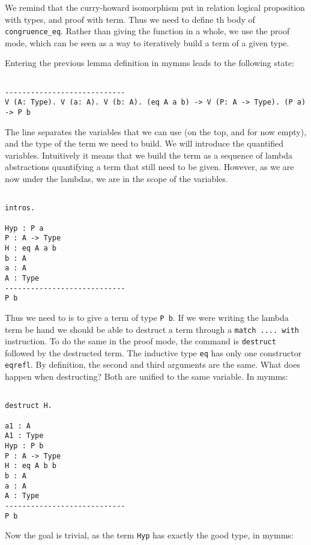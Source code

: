 \documentclass[a4paper,5pt,onecolumn]{article}
\begin{document}
We remind that the curry-howard isomorphism put in relation logical
proposition with types, and proof with term. Thus we need to define th
body of \texttt{congruence\_eq}. Rather than giving the function in a
whole, we use the proof mode, which can be seen as a way to
iteratively build a term of a given type.

Entering the previous lemma definition in mymms leads to the following state:

\begin{verbatim}

----------------------------
V (A: Type). V (a: A). V (b: A). (eq A a b) -> V (P: A -> Type). (P a) -> P b

\end{verbatim}


The line separates the variables that we can use (on the top, and for
now empty), and the type of the term we need to build. We will
introduce the quantified variables. Intuitively it means that we build
the term as a sequence of lambda abstractions quantifying a term that
still need to be given. However, as we are now under the lambdas, we
are in the scope of the variables.

\begin{verbatim}

intros.

Hyp : P a
P : A -> Type
H : eq A a b
b : A
a : A
A : Type
----------------------------
P b

\end{verbatim}

Thus we need to is to give a term of type \texttt{P b}. If we were
writing the lambda term be hand we should be able to destruct a term
through a \texttt{match .... with} instruction. To do the same in the
proof mode, the command is \texttt{destruct} followed by the
destructed term. The inductive type \texttt{eq} has only one
constructor \texttt{eqrefl}. By definition, the second and third
arguments are the same. What does happen when destructing? Both are
unified to the same variable. In mymms:

\begin{verbatim}

destruct H.

a1 : A
A1 : Type
Hyp : P b
P : A -> Type
H : eq A b b
b : A
a : A
A : Type
----------------------------
P b

\end{verbatim}

Now the goal is trivial, as the term \texttt{Hyp} has exactly the good
type, in mymms:
\end{document}
